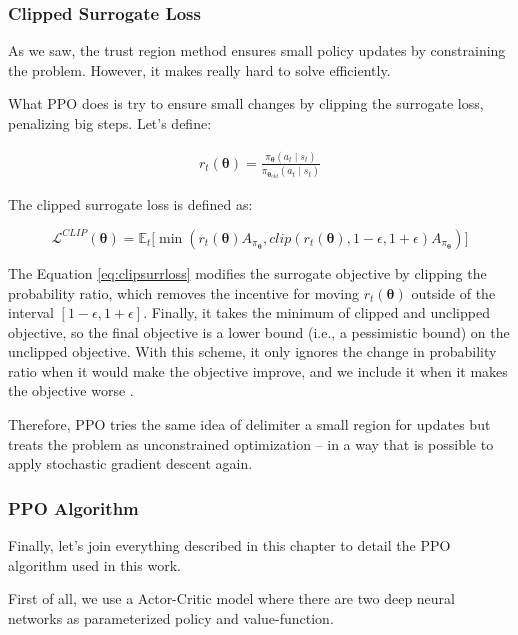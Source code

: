 \subsubsection{Clipped Surrogate Loss}

As we saw, the trust region method ensures small policy updates by constraining the problem. However, it makes really hard to solve efficiently.

What PPO does is try to ensure small changes by clipping the surrogate loss, penalizing big steps. Let's define:

\begin{eqnarray}
r_{t}(\boldsymbol{\theta}) = \frac{\pi_{\boldsymbol{\theta}}(a_{t} \mid s_{t})}{\pi_{\boldsymbol{\theta}_{old}}(a_{t} \mid s_{t})}
\end{eqnarray}

The clipped surrogate loss is defined as:

\begin{equation}\label{eq:clipsurrloss}
\mathcal{L}^{CLIP}(\boldsymbol{\theta}) = \mathbb{E}_{t}\Big[ \min(r_{t}(\boldsymbol{\theta})A_{\pi_{\boldsymbol{\theta}}}, clip(r_{t}(\boldsymbol{\theta}), 1 - \epsilon, 1 + \epsilon)A_{\pi_{\boldsymbol{\theta}}})\Big]
\end{equation}

The Equation \ref{eq:clipsurrloss} modifies the surrogate objective by clipping the probability ratio, which removes the incentive for moving $r_{t}(\boldsymbol{\theta})$ outside of the
interval $[1 - \epsilon, 1 + \epsilon]$. Finally, it takes the minimum of clipped and unclipped objective, so the
final objective is a lower bound (i.e., a pessimistic bound) on the unclipped objective. With this
scheme, it only ignores the change in probability ratio when it would make the objective improve, and we include it when it makes the objective worse \cite{ppoalgorithm}.

Therefore, PPO tries the same idea of delimiter a small region for updates but treats the problem as unconstrained optimization -- in a way that is possible to apply stochastic gradient descent again. 

\subsubsection{PPO Algorithm}
Finally, let's join everything described in this chapter to detail the PPO algorithm used in this work.

First of all, we use a Actor-Critic model where there are two deep neural networks as parameterized policy and value-function.

